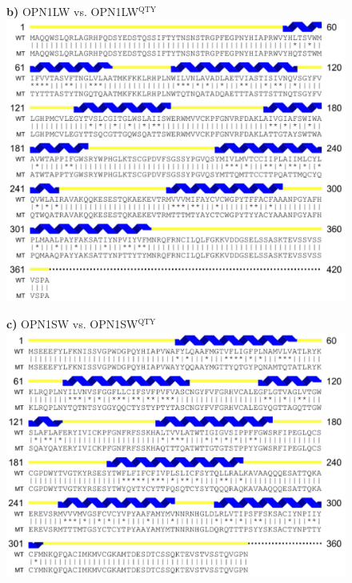 \documentclass[fleqn,12pt]{supp}
\begin{document}
\newpage
\begin{figure}[H]
    \textbf{b)} OPN1LW vs. OPN1LW$^{\textrm{QTY}}$ \\
    \includegraphics[width=\linewidth]{SuppFigures/opn1lw.jpg}
\end{figure}

\newpage
\begin{figure}[H]
    \textbf{c)} OPN1SW vs. OPN1SW$^{\textrm{QTY}}$ \\
    \includegraphics[width=\linewidth]{SuppFigures/opn1sw.jpg}
\end{figure}
\end{document}
